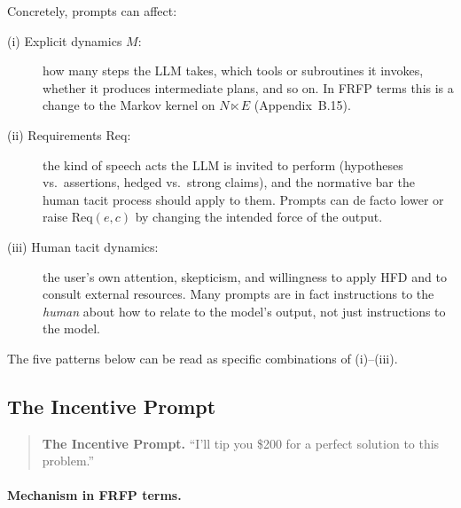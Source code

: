 Concretely, prompts can affect:

\begin{description}
  \item[(i) Explicit dynamics $M$:] how many steps the LLM takes, which
    tools or subroutines it invokes, whether it produces intermediate
    plans, and so on. In FRFP terms this is a change to the Markov kernel
    on $N \ltimes E$ (Appendix~B.15).

  \item[(ii) Requirements $\mathrm{Req}$:] the kind of speech acts the LLM
    is invited to perform (hypotheses vs.\ assertions, hedged vs.\ strong
    claims), and the normative bar the human tacit process should apply to
    them. Prompts can de facto lower or raise $\mathrm{Req}(e,c)$ by
    changing the intended force of the output.

  \item[(iii) Human tacit dynamics:] the user's own attention, skepticism,
    and willingness to apply HFD and to consult external resources. Many
    prompts are in fact instructions to the \emph{human} about how to
    relate to the model's output, not just instructions to the model.
\end{description}

The five patterns below can be read as specific combinations of (i)--(iii).

\subsection{The Incentive Prompt}

\begin{quote}
\textbf{The Incentive Prompt.} ``I'll tip you \$200 for a perfect solution
to this problem.''
\end{quote}

\paragraph{Mechanism in FRFP terms.}

